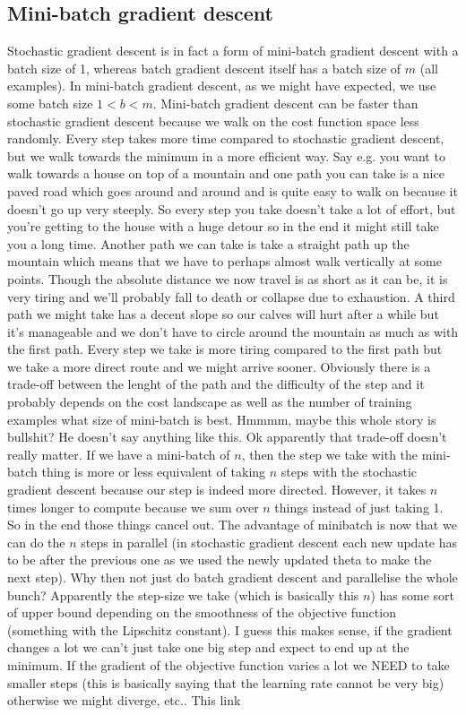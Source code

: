 \documentclass[a4paper, 10pt,hidelinks]{article}
\begin{document}
\subsection{Mini-batch gradient descent}
Stochastic gradient descent is in fact a form of mini-batch gradient descent with a batch size of 1, whereas batch gradient descent itself has a batch size of $m$ (all examples). In mini-batch gradient descent, as we might have expected, we use some batch size $1 < b < m$. Mini-batch gradient descent can be faster than stochastic gradient descent because we walk on the cost function space less randomly. Every step takes more time compared to stochastic gradient descent, but we walk towards the minimum in a more efficient way. Say e.g. you want to walk towards a house on top of a mountain and one path you can take is a nice paved road which goes around and around and is quite easy to walk on because it doesn't go up very steeply. So every step you take doesn't take a lot of effort, but you're getting to the house with a huge detour so in the end it might still take you a long time. Another path we can take is take a straight path up the mountain which means that we have to perhaps almost walk vertically at some points. Though the absolute distance we now travel is as short as it can be, it is very tiring and we'll probably fall to death or collapse due to exhaustion. A third path we might take has a decent slope so our calves will hurt after a while but it's manageable and we don't have to circle around the mountain as much as with the first path. Every step we take is more tiring compared to the first path but we take a more direct route and we might arrive sooner. Obviously there is a trade-off between the lenght of the path and the difficulty of the step and it probably depends on the cost landscape as well as the number of training examples what size of mini-batch is best.  Hmmmm, maybe this whole story is bullshit? He doesn't say anything like this. Ok apparently that trade-off doesn't really matter. If we have a mini-batch of $n$, then the step we take with the mini-batch thing is more or less equivalent of taking $n$ steps with the stochastic gradient descent because our step is indeed more directed. However, it takes $n$ times longer to compute because we sum over $n$ things instead of just taking 1. So in the end those things cancel out. The advantage of minibatch is now that we can do the $n$ steps in parallel (in stochastic gradient descent each new update has to be after the previous one as we used the newly updated theta to make the next step). Why then not just do batch gradient descent and parallelise the whole bunch? Apparently the step-size we take (which is basically this $n$) has some sort of upper bound depending on the smoothness of the objective function (something with the Lipschitz constant). I guess this makes sense, if the gradient changes a lot we can't just take one big step and expect to end up at the minimum. If the gradient of the objective function varies a lot we NEED to take smaller steps (this is basically saying that the learning rate cannot be very big) otherwise we might diverge, etc.. This link
\end{document}

